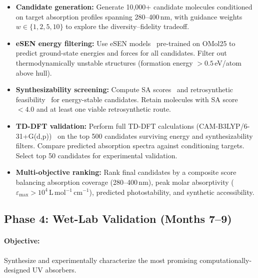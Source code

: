\documentclass[11pt,a4paper]{article}
\begin{document}
\begin{itemize}[leftmargin=*]
  \item \textbf{Candidate generation:} Generate 10,000+ candidate molecules conditioned
    on target absorption profiles spanning 280--400\,nm, with guidance weights $w \in
    \{1, 2, 5, 10\}$ to explore the diversity--fidelity tradeoff.

  \item \textbf{eSEN energy filtering:} Use eSEN models~\citep{fairchem2024} pre-trained
    on OMol25 to predict ground-state energies and forces for all candidates. Filter out
    thermodynamically unstable structures (formation energy $> 0.5$\,eV/atom above hull).

  \item \textbf{Synthesizability screening:} Compute SA
    scores~\citep{ertl2009sa} and retrosynthetic
    feasibility~\citep{coley2017retrosynthesis} for energy-stable candidates.
    Retain molecules with SA score $< 4.0$ and at least one viable retrosynthetic route.

  \item \textbf{TD-DFT validation:} Perform full TD-DFT calculations
    (CAM-B3LYP/6-31+G(d,p))~\citep{casida1995tddft} on the top 500 candidates surviving
    energy and synthesizability filters. Compare predicted absorption spectra against
    conditioning targets. Select top 50 candidates for experimental validation.

  \item \textbf{Multi-objective ranking:} Rank final candidates by a composite score
    balancing absorption coverage (280--400\,nm), peak molar absorptivity
    ($\varepsilon_\text{max} > 10^4$\,L\,mol$^{-1}$\,cm$^{-1}$), predicted
    photostability, and synthetic accessibility.
\end{itemize}

\subsection{Phase 4: Wet-Lab Validation (Months 7--9)}

\paragraph{Objective:} Synthesize and experimentally characterize the most promising
computationally-designed UV absorbers.
\end{document}
